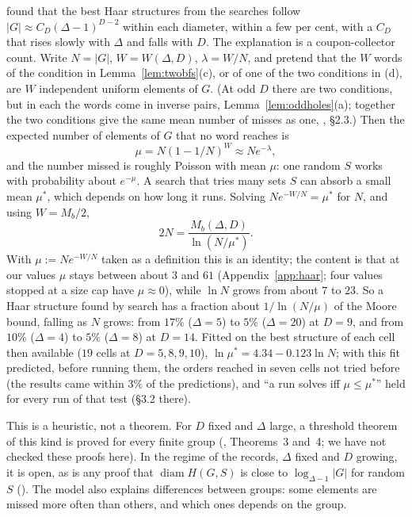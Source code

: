 \documentclass[11pt]{amsart}
\theoremstyle{definition}
\theoremstyle{remark}
\newcommand{\diam}{\operatorname{diam}}
\begin{document}
 found that the best Haar structures from the searches follow $|G|\approx C_D(\Delta-1)^{D-2}$ within each diameter, within a few per cent, with a $C_D$ that rises slowly with $\Delta$ and falls with $D$. The explanation is a coupon-collector count. Write $N=|G|$, $W=W(\Delta,D)$, $\lambda=W/N$, and pretend that the $W$ words of the condition in Lemma~\ref{lem:twobfs}(c), or of one of the two conditions in (d), are $W$ independent uniform elements of $G$. (At odd $D$ there are two conditions, but in each the words come in inverse pairs, Lemma~\ref{lem:oddholes}(a); together the two conditions give the same mean number of misses as one, , \S2.3.) Then the expected number of elements of $G$ that no word reaches is
$$\mu=N(1-1/N)^W\approx Ne^{-\lambda},$$
and the number missed is roughly Poisson with mean $\mu$: one random $S$ works with probability about $e^{-\mu}$. A search that tries many sets $S$ can absorb a small mean $\mu^*$, which depends on how long it runs. Solving $Ne^{-W/N}=\mu^*$ for $N$, and using $W=M_b/2$,
$$2N=\frac{M_b(\Delta,D)}{\ln(N/\mu^*)}.$$
With $\mu:=Ne^{-W/N}$ taken as a definition this is an identity; the content is that at our values $\mu$ stays between about $3$ and $61$ (Appendix~\ref{app:haar}; four values stopped at a size cap have $\mu\approx0$), while $\ln N$ grows from about $7$ to $23$. So a Haar structure found by search has a fraction about $1/\ln(N/\mu)$ of the Moore bound, falling as $N$ grows: from $17\%$ ($\Delta=5$) to $5\%$ ($\Delta=20$) at $D=9$, and from $10\%$ ($\Delta=4$) to $5\%$ ($\Delta=8$) at $D=14$. Fitted on the best structure of each cell then available ($19$ cells at $D=5,8,9,10$), $\ln\mu^*=4.34-0.123\ln N$; with this fit  predicted, before running them, the orders reached in seven cells not tried before (the results came within $3\%$ of the predictions), and ``a run solves iff $\mu\le\mu^*$'' held for every run of that test (\S3.2 there).

This is a heuristic, not a theorem. For $D$ fixed and $\Delta$ large, a threshold theorem of this kind is proved for every finite group (, Theorems~3 and~4; we have not checked these proofs here). In the regime of the records, $\Delta$ fixed and $D$ growing, it is open, as is any proof that $\diam H(G,S)$ is close to $\log_{\Delta-1}|G|$ for random $S$ (). The model also explains differences between groups: some elements are missed more often than others, and which ones depends on the group.
\end{document}
